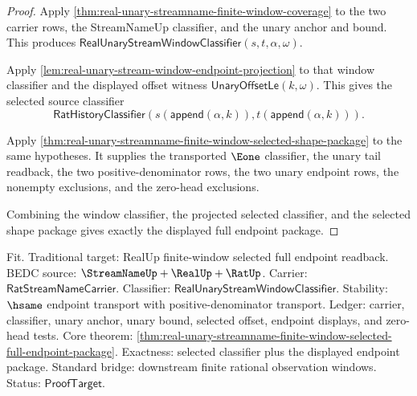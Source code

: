 \begin{proof}
Apply \autoref{thm:real-unary-streamname-finite-window-coverage} to the two
carrier rows, the StreamNameUp classifier, and the unary anchor and bound. This
produces $\mathsf{RealUnaryStreamWindowClassifier}(s,t,\alpha,\omega)$.

Apply \autoref{lem:real-unary-stream-window-endpoint-projection} to that window
classifier and the displayed offset witness $\mathsf{UnaryOffsetLe}(k,\omega)$.
This gives the selected source classifier
$$
\mathsf{RatHistoryClassifier}(
s(\mathsf{append}(\alpha,k)),t(\mathsf{append}(\alpha,k))).
$$

Apply
\autoref{thm:real-unary-streamname-finite-window-selected-shape-package} to the
same hypotheses. It supplies the transported $\Eone$ classifier, the unary tail
readback, the two positive-denominator rows, the two unary endpoint rows, the
nonempty exclusions, and the zero-head exclusions.

Combining the window classifier, the projected selected classifier, and the
selected shape package gives exactly the displayed full endpoint package.
\end{proof}

Fit. Traditional target: RealUp finite-window selected full endpoint readback.
BEDC source: $\StreamNameUp+\RealUp+\RatUp$. Carrier:
$\mathsf{RatStreamNameCarrier}$. Classifier:
$\mathsf{RealUnaryStreamWindowClassifier}$. Stability: $\hsame$ endpoint
transport with positive-denominator transport. Ledger: carrier, classifier,
unary anchor, unary bound, selected offset, endpoint displays, and zero-head
tests. Core theorem:
\autoref{thm:real-unary-streamname-finite-window-selected-full-endpoint-package}.
Exactness: selected classifier plus the displayed endpoint package. Standard
bridge: downstream finite rational observation windows. Status:
$\mathsf{ProofTarget}$.
